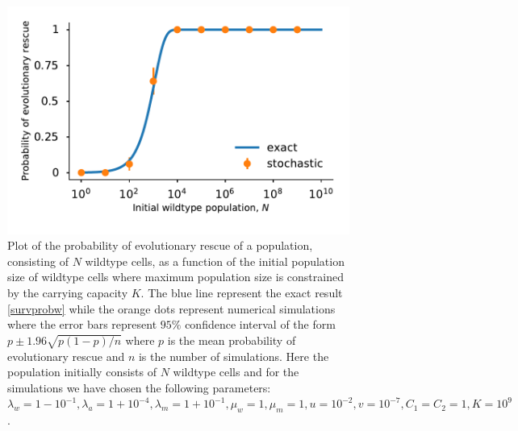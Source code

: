 \documentclass[12pt]{extarticle}
\begin{document}
\begin{figure}[!h]
 \vspace*{1\baselineskip}
\includegraphics[width=1\textwidth]{Figures/SurvPlotNDataLogisticK.pdf}
\caption{Plot of the probability of evolutionary rescue of a population, consisting of $N$ wildtype cells, as a function of the initial population size of wildtype cells where maximum population size is constrained by the carrying capacity $K$.  The blue line represent the exact result \eqref{survprobw} while the orange dots represent numerical simulations where the error bars represent $95\%$ confidence interval of the form $p\pm1.96\sqrt{p\left(1-p\right)/n}$ where $p$ is the mean probability of evolutionary rescue and $n$ is the number of simulations. Here the population initially consists of $N$ wildtype cells and for the simulations we have chosen the following parameters: $\lambda_w=1-10^{-1},\lambda_a=1+10^{-4},\lambda_m=1+10^{-1},\mu_w=1,\mu_m=1,u=10^{-2},v=10^{-7}, C_1=C_2=1, K=10^9$.}
\label{SurvPlotNDataLogisticKComplete}
\end{figure}
\end{document}
